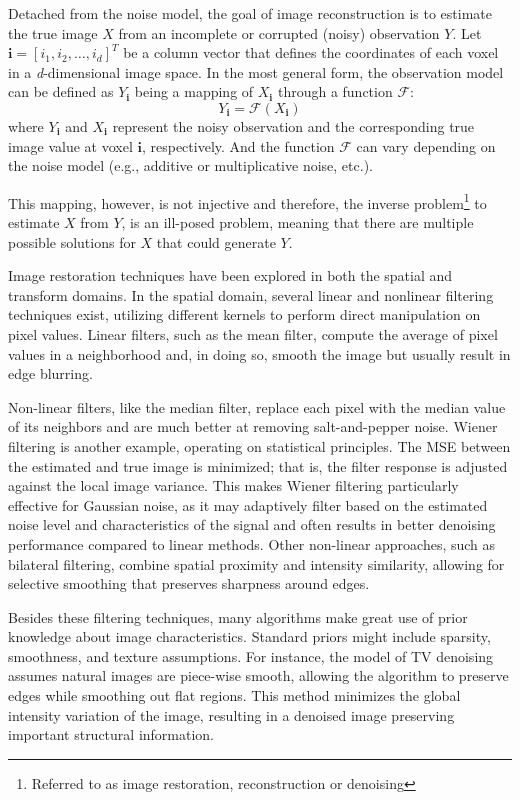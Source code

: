 Detached from the noise model, the goal of image reconstruction is to estimate the true image $X$ from an incomplete or corrupted (noisy) observation $Y$. Let $\mathbf{i} = [i_1, i_2, \dots, i_d]^T$ be a column vector that defines the coordinates of each voxel in a \textit{d}-dimensional image space. In the most general form, the observation model can be defined as $Y_{\mathbf{i}}$ being a mapping of $X_{\mathbf{i}}$ through a function $\mathcal{F}$:
\begin{equation}
    Y_{\mathbf{i}} = \mathcal{F} (X_{\mathbf{i}})
\end{equation}
where $Y_{\mathbf{i}}$ and $X_{\mathbf{i}}$ represent the noisy observation and the corresponding true image value at voxel $\mathbf{i}$, respectively. And the function $\mathcal{F}$ can vary depending on the noise model (e.g., additive or multiplicative noise, etc.).

This mapping, however, is not injective and therefore, the inverse problem\footnote{Referred to as image restoration, reconstruction or denoising} to estimate $X$ from $Y$, is an ill-posed problem, meaning that there are multiple possible solutions for $X$ that could generate $Y$.

Image restoration techniques have been explored in both the spatial and transform domains. In the spatial domain, several linear and nonlinear filtering techniques exist, utilizing different kernels to perform direct manipulation on pixel values. Linear filters, such as the mean filter, compute the average of pixel values in a neighborhood and, in doing so, smooth the image but usually result in edge blurring.

Non-linear filters, like the median filter, replace each pixel with the median value of its neighbors and are much better at removing salt-and-pepper noise. Wiener filtering is another example, operating on statistical principles. The \gls{MSE} between the estimated and true image is minimized; that is, the filter response is adjusted against the local image variance. This makes Wiener filtering particularly effective for Gaussian noise, as it may adaptively filter based on the estimated noise level and characteristics of the signal and often results in better denoising performance compared to linear methods. Other non-linear approaches, such as bilateral filtering, combine spatial proximity and intensity similarity, allowing for selective smoothing that  preserves sharpness around edges. 

Besides these filtering techniques, many algorithms make great use of prior knowledge about image characteristics. Standard priors might include sparsity, smoothness, and texture assumptions. For instance, the model of TV denoising assumes natural images are piece-wise smooth, allowing the algorithm to preserve edges while smoothing out flat regions. This method minimizes the global intensity variation of the image, resulting in a denoised image preserving important structural information.

